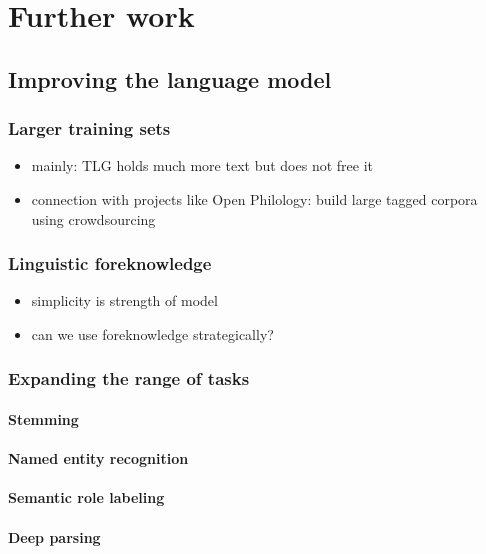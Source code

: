 \chapter{Further work} %
\label{cha:further_work} %


\section{Improving the language model}
\subsection{Larger training sets}
\begin{itemize}
\item mainly: TLG holds much more text but does not free it
\item connection with projects like Open Philology: build large tagged
corpora using crowdsourcing
\end{itemize}
\subsection{Linguistic foreknowledge}
\begin{itemize}
\item simplicity is strength of model
\item can we use foreknowledge strategically?
\end{itemize}
\subsection{Expanding the range of tasks}
\subsubsection{Stemming}
\subsubsection{Named entity recognition}
\subsubsection{Semantic role labeling}
\subsubsection{Deep parsing}

